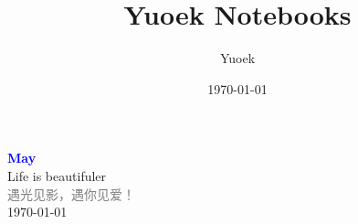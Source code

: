 \documentclass[UTF8, a4paper, 12pt]{ctexart}
\title{\Large Yuoek Notebooks}
\author{Yuoek}
\date{\today}
\begin{document}
\thispagestyle{empty}
\maketitle
\clearpage

\tableofcontents
\clearpage

\thispagestyle{empty}
\vspace*{\fill}
\begin{center}
    \textcolor{blue}{\Huge\textbf{May}} \\[1em]
    \textcolor{blue!60!black}{\Large Life is beautifuler} \\[2em]
    \textcolor{gray}{\large 遇光见影，遇你见爱！} \\[1em]
    \today
\end{center}
\vspace*{\fill}
\clearpage


\clearpage


\clearpage

\clearpage


\clearpage
\end{document}
